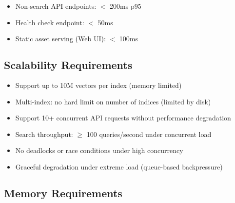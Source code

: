 \documentclass[11pt,a4paper]{article}
\begin{document}
\begin{reqbox}
\begin{itemize}
    \item Non-search API endpoints: $<$ 200ms p95
    \item Health check endpoint: $<$ 50ms
    \item Static asset serving (Web UI): $<$ 100ms
\end{itemize}
\end{reqbox}

\subsection{Scalability Requirements}

\begin{reqbox}
\begin{itemize}
    \item Support up to 10M vectors per index (memory limited)
    \item Multi-index: no hard limit on number of indices (limited by disk)
\end{itemize}
\end{reqbox}

\begin{reqbox}
\begin{itemize}
    \item Support 10+ concurrent API requests without performance degradation
    \item Search throughput: $\geq$ 100 queries/second under concurrent load
    \item No deadlocks or race conditions under high concurrency
    \item Graceful degradation under extreme load (queue-based backpressure)
\end{itemize}
\end{reqbox}

\subsection{Memory Requirements}
\end{document}
